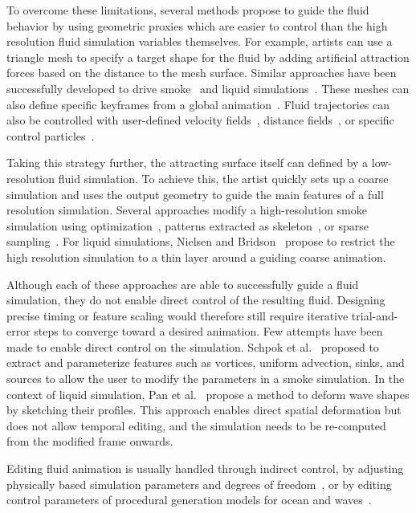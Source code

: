 To overcome these limitations, several methods propose to guide the fluid behavior by using geometric proxies which are easier to control than the high resolution fluid simulation variables themselves.
For example, artists can use a triangle mesh to specify a target shape for the fluid by adding artificial attraction forces based on the distance to the mesh surface. Similar approaches have been successfully developed to drive smoke~\cite{Fattal2004,Hong2004,Shi2005a} and liquid simulations~\cite{Shi2005b,Raveendran2012}. These meshes can also define specific keyframes from a global animation~\cite{Treuille2003,McNamara2004}.
Fluid trajectories can also be controlled with user-defined velocity fields~\cite{Kim2006}, distance fields~\cite{Yang2013}, or specific control particles~\cite{Thurey2006,Madill2013}. 

Taking this strategy further, the attracting surface itself can defined by a low-resolution fluid simulation. To achieve this, the artist quickly sets up a coarse simulation and uses the output geometry to guide the main features of a full resolution simulation.
Several approaches modify a high-resolution smoke simulation using optimization~\cite{Nielsen2009,Nielsen2010}, patterns extracted as skeleton~\cite{Yuan2011}, or sparse sampling~\cite{Huang2013}.
For liquid simulations, Nielsen and Bridson~\cite{Nielsen2011} propose to restrict the high resolution simulation to a thin layer around a guiding coarse animation.

Although each of these approaches are able to successfully guide a fluid simulation, they do not enable direct control of the resulting fluid. Designing precise timing or feature scaling would therefore still require iterative trial-and-error steps to converge toward a desired animation.
Few attempts have been made to enable direct control on the simulation. Schpok et al.~\cite{Schpok2005} proposed to extract and parameterize features such as vortices, uniform advection, sinks, and sources to allow the user to modify the parameters in a smoke simulation. In the context of liquid simulation, Pan et al.~\cite{Pan2013} propose a method to deform wave shapes by sketching their profiles. This approach enables direct spatial deformation but does not allow temporal editing, and the simulation needs to be re-computed from the modified frame onwards.

Editing fluid animation is usually handled through indirect control, by adjusting physically based simulation parameters and degrees of freedom~\cite{stam1999,ihmsen2014}, or by editing control parameters of procedural generation models for ocean and waves~\cite{Fournier1986,hinsinger2002,Tessendorf2004,jeschke2015water}. 

